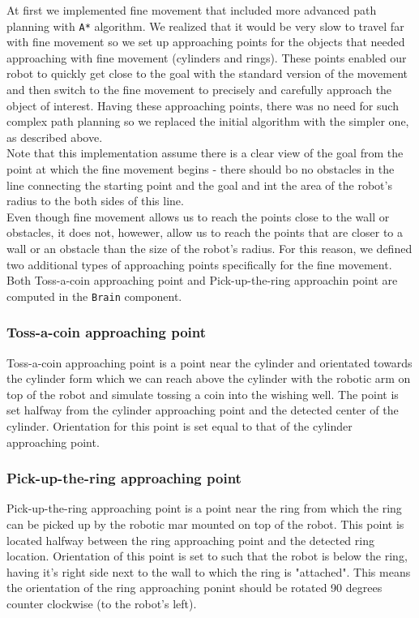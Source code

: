 \documentclass[12pt,a4paper]{article}
\begin{document}
	At first we implemented fine movement that included more advanced path planning with \texttt{A*} algorithm. We realized that it would be very slow to travel far with fine movement so we set up approaching points for the objects that needed approaching with fine movement (cylinders and rings). These points enabled our robot to quickly get close to the goal with the standard version of the movement and then switch to the fine movement to precisely and carefully approach the object of interest. Having these approaching points, there was no need for such complex path planning so we replaced the initial algorithm with the simpler one, as described above. \\
	
	Note that this implementation assume there is a clear view of the goal from the point at which the fine movement begins - there should bo no obstacles in the line connecting the starting point and the goal and int the area of the robot's radius to the both sides of this line. \\

	Even though fine movement allows us to reach the points close to the wall or obstacles, it does not, howewer, allow us to reach the points that are closer to a wall or an obstacle than the size of the robot's radius. For this reason, we defined two additional types of approaching points specifically for the fine movement. Both Toss-a-coin approaching point and Pick-up-the-ring approachin point are computed in the \texttt{Brain} component.

	\subsubsection{Toss-a-coin approaching point} \label{toss-a-coin-point}
	Toss-a-coin approaching point is a point near the cylinder and orientated towards the cylinder form which we can reach above the cylinder with the robotic arm on top of the robot and simulate tossing a coin into the wishing well. The point is set halfway from the cylinder approaching point and the detected center of the cylinder. Orientation for this point is set equal to that of the cylinder approaching point.

	\subsubsection{Pick-up-the-ring approaching point} \label{pick-up-the-ring-point}
	Pick-up-the-ring approaching point is a point near the ring from which the ring can be picked up by the robotic mar mounted on top of the robot. This point is located halfway between the ring approaching point and the detected ring location. Orientation of this point is set to such that the robot is below the ring, having it's right side next to the wall to which the ring is "attached". This means the orientation of the ring approaching ponint should be rotated 90 degrees counter clockwise (to the robot's left).
	
\end{document}

